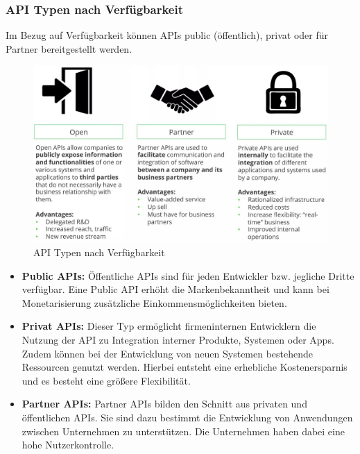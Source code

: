 \subsubsection{API Typen nach Verfügbarkeit} %
\label{sec:apitypenverfuegbarkeit}
Im Bezug auf Verfügbarkeit können APIs public (öffentlich), privat oder für Partner bereitgestellt werden. 
\citep{apimindset}
\begin{figure}[h!]
	\centering
	\includegraphics[scale=0.225]{Illustrations/apitypes.jpg}
	\caption{API Typen nach Verfügbarkeit \citep{graficapitypes}}
\end{figure}

\begin{itemize}
	\item \textbf{Public APIs:} Öffentliche APIs sind für jeden Entwickler bzw. jegliche Dritte verfügbar. Eine Public API erhöht die Markenbekanntheit und kann bei Monetarisierung zusätzliche Einkommensmöglichkeiten bieten. \citep{apimindset}
	\item \textbf{Privat APIs:} Dieser Typ ermöglicht firmeninternen Entwicklern die Nutzung der API zu Integration interner Produkte, Systemen oder Apps. Zudem können bei der Entwicklung von neuen Systemen bestehende Ressourcen genutzt werden. Hierbei entsteht eine erhebliche Kostenersparnis und es besteht eine größere Flexibilität. \citep{apimindset}
	\item \textbf{Partner APIs:} Partner APIs bilden den Schnitt aus privaten und öffentlichen APIs. Sie sind dazu bestimmt die Entwicklung von Anwendungen zwischen Unternehmen zu unterstützen. Die Unternehmen haben dabei eine hohe Nutzerkontrolle.\citep{apimindset}
\end{itemize}

